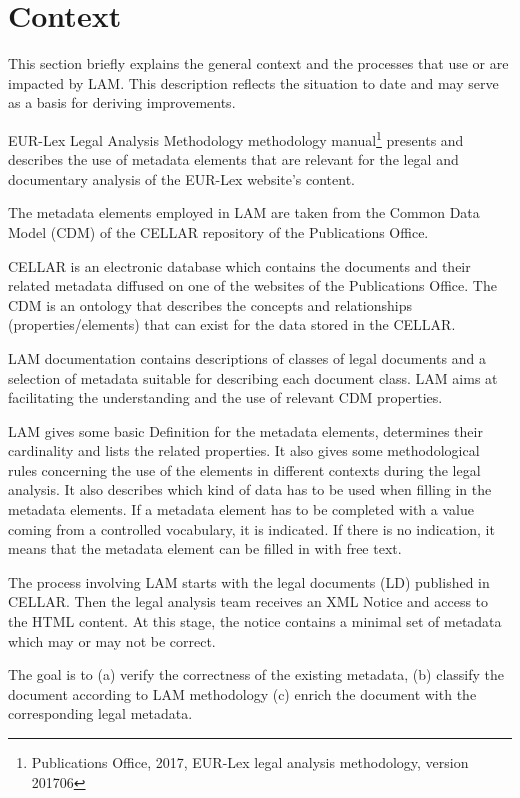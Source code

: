 
\section{Context}\label{ariaid-title12}

This section briefly explains the general context and the processes
that use or are impacted by LAM. This description reflects the situation to
date and may serve as a basis for deriving improvements.

EUR-Lex Legal Analysis Methodology methodology manual\footnote{Publications Office, 2017, EUR-Lex legal analysis methodology, version 201706} presents and describes the use of metadata elements that are relevant for the legal and documentary analysis of the EUR-Lex website's content.

The metadata elements employed in LAM are taken from the Common Data Model (CDM) of the CELLAR repository of the Publications Office.

CELLAR is an electronic database which contains the documents and their related metadata diffused on one of the websites of the Publications Office. The CDM is an ontology that describes the concepts and relationships (properties/elements) that can exist for the data stored in the CELLAR.

LAM documentation contains descriptions of classes of legal documents and a selection of metadata suitable for describing each document class. LAM aims at facilitating the understanding and the use of relevant CDM properties.

LAM gives some basic Definition for the metadata elements, determines their cardinality and lists the related properties. It also gives some methodological rules concerning the use of the elements in different contexts during the legal analysis. It also describes which kind of data has to be used when filling in the metadata elements. If a metadata element has to be completed with a value coming from a controlled vocabulary, it is indicated. If there is no indication, it means that the metadata element can be filled in with free text.

The process involving LAM starts with the legal documents (LD) published in CELLAR. Then the legal analysis team receives an XML Notice and access to the HTML content. At this stage, the notice contains a minimal set of metadata which may or may not be correct.

The goal is to (a) verify the correctness of the existing metadata, (b) classify the document according to LAM methodology (c) enrich the document with the corresponding legal metadata.

